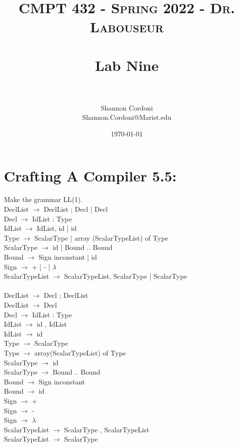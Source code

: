 \documentclass[letterpaper, 10pt,DIV=13]{scrartcl}
\title{	
   \normalfont \normalsize 
   \textsc{CMPT 432 - Spring 2022 - Dr. Labouseur} \\[10pt] %
   \horrule{0.5pt} \\[0.25cm] 	%
   \huge Lab Nine  \\     	    %
   \horrule{0.5pt} \\[0.25cm] 	%
}
\author{Shannon Cordoni \\ \normalsize Shannon.Cordoni@Marist.edu}
\date{\normalsize\today} 	%
\numberwithin{equation}{section} %
\numberwithin{figure}{section} %
\numberwithin{table}{section} %
\begin{document}
\maketitle %

\section{Crafting A Compiler 5.5: }

\paragraph{} Make the grammar LL(1).\\

DeclList $\to$ DeclList ; Decl | Decl\\
Decl $\to$ IdList : Type\\
IdList $\to$ IdList, id | id \\
Type $\to$ ScalarType | array (ScalarTypeList) of Type\\
ScalarType $\to$ id | Bound .. Bound\\
Bound $\to$ Sign inconstant | id\\
Sign $\to$ + | - | $\lambda$\\
ScalarTypeList $\to$ ScalarTypeList, ScalarType | ScalarType\\

\\

DeclList $\to$ Decl ; DeclList \\
DeclList $\to$ Decl\\
Decl $\to$ IdList : Type\\
IdList $\to$ id , IdList\\
IdList $\to$ id \\
Type $\to$ ScalarType\\
Type $\to$ array(ScalarTypeList) of Type\\
ScalarType $\to$ id \\
ScalarType $\to$ Bound .. Bound\\
Bound $\to$ Sign inconstant \\
Bound $\to$ id\\
Sign $\to$ + \\
Sign $\to$ - \\
Sign $\to$ $\lambda$\\
ScalarTypeList $\to$ ScalarType , ScalarTypeList\\
ScalarTypeList $\to$ ScalarType\\
\end{document}
